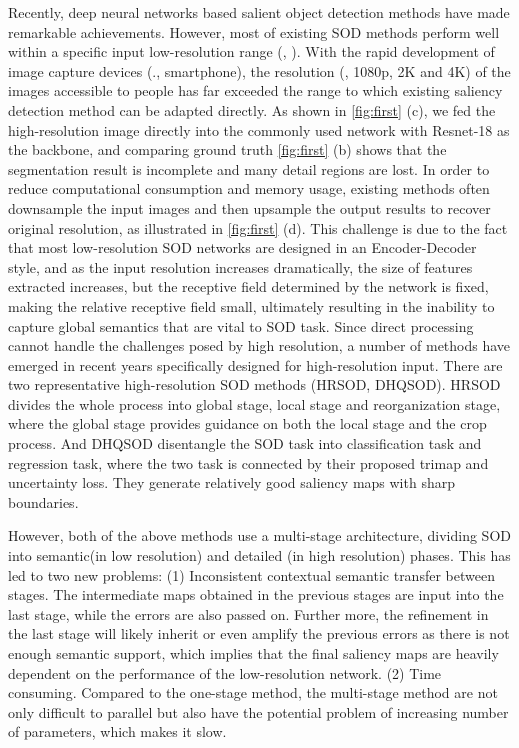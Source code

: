 \documentclass[10pt,twocolumn,letterpaper]{article}
\begin{document}
Recently, deep neural networks based salient object detection methods have made remarkable achievements\cite{chen2018reverse,su2019banet,liu2020dynamic,qin2020u2,ji2021calibrated,fan2020bbs}. However, most of existing SOD methods perform well within a specific input low-resolution range (\eg,  ). With the rapid development of image capture devices (\eg., smartphone), the resolution (\eg, 1080p, 2K and 4K) of the images accessible to people has far exceeded the range to which existing saliency detection method can be adapted directly. As shown in \cref{fig:first} (c), we fed the high-resolution image directly into the commonly used network with Resnet-18 as the backbone, and comparing ground truth \cref{fig:first} (b) shows that the segmentation result is incomplete and many detail regions are lost. In order to reduce computational consumption and memory usage, existing methods often downsample the input images and then upsample the output results to recover original resolution, as illustrated in \cref{fig:first} (d). This challenge is due to the fact that most low-resolution SOD networks are designed in an Encoder-Decoder style, and as the input resolution increases dramatically, the size of features extracted increases, but the receptive field determined by the network is fixed, making the relative receptive field small, ultimately resulting in the inability to capture global semantics that are vital to SOD task. 
Since direct processing cannot handle the challenges posed by high resolution, a number of methods have emerged in recent years specifically designed for high-resolution input.
There are two representative high-resolution SOD methods (HRSOD\cite{zeng2019towards}, DHQSOD\cite{tang2021disentangled}). HRSOD divides the whole process into global stage, local stage and reorganization stage, where the global stage provides guidance on both the local stage and the crop process. And DHQSOD disentangle the SOD task into classification task and regression task, where the two task is connected by their proposed trimap and uncertainty loss. They generate relatively good saliency maps with sharp boundaries. 

However, both of the above methods use a multi-stage architecture, dividing SOD into semantic(in low resolution) and detailed (in high resolution) phases. This has led to two new problems: (1) Inconsistent contextual semantic transfer between stages. The intermediate maps obtained in the previous stages are input into the last stage, while the errors are also passed on. Further more, the refinement in the last stage will likely inherit or even amplify the previous errors as there is not enough semantic support, which implies that the final saliency maps are heavily dependent on the performance of the low-resolution network. (2) Time consuming. Compared to the one-stage method, the multi-stage method are not only difficult to parallel but also have the potential problem of increasing number of parameters, which makes it slow.
\end{document}
